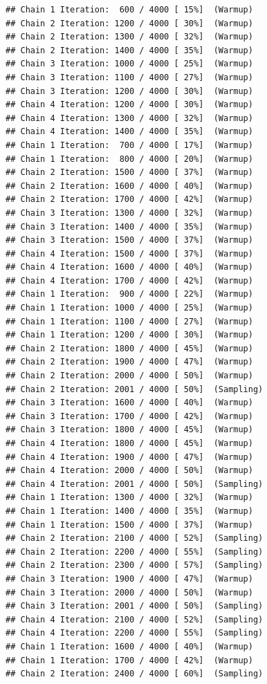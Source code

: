 \documentclass[
]{article}
\begin{document}
\begin{verbatim}
## Chain 1 Iteration:  600 / 4000 [ 15%]  (Warmup) 
## Chain 2 Iteration: 1200 / 4000 [ 30%]  (Warmup) 
## Chain 2 Iteration: 1300 / 4000 [ 32%]  (Warmup) 
## Chain 2 Iteration: 1400 / 4000 [ 35%]  (Warmup) 
## Chain 3 Iteration: 1000 / 4000 [ 25%]  (Warmup) 
## Chain 3 Iteration: 1100 / 4000 [ 27%]  (Warmup) 
## Chain 3 Iteration: 1200 / 4000 [ 30%]  (Warmup) 
## Chain 4 Iteration: 1200 / 4000 [ 30%]  (Warmup) 
## Chain 4 Iteration: 1300 / 4000 [ 32%]  (Warmup) 
## Chain 4 Iteration: 1400 / 4000 [ 35%]  (Warmup) 
## Chain 1 Iteration:  700 / 4000 [ 17%]  (Warmup) 
## Chain 1 Iteration:  800 / 4000 [ 20%]  (Warmup) 
## Chain 2 Iteration: 1500 / 4000 [ 37%]  (Warmup) 
## Chain 2 Iteration: 1600 / 4000 [ 40%]  (Warmup) 
## Chain 2 Iteration: 1700 / 4000 [ 42%]  (Warmup) 
## Chain 3 Iteration: 1300 / 4000 [ 32%]  (Warmup) 
## Chain 3 Iteration: 1400 / 4000 [ 35%]  (Warmup) 
## Chain 3 Iteration: 1500 / 4000 [ 37%]  (Warmup) 
## Chain 4 Iteration: 1500 / 4000 [ 37%]  (Warmup) 
## Chain 4 Iteration: 1600 / 4000 [ 40%]  (Warmup) 
## Chain 4 Iteration: 1700 / 4000 [ 42%]  (Warmup) 
## Chain 1 Iteration:  900 / 4000 [ 22%]  (Warmup) 
## Chain 1 Iteration: 1000 / 4000 [ 25%]  (Warmup) 
## Chain 1 Iteration: 1100 / 4000 [ 27%]  (Warmup) 
## Chain 1 Iteration: 1200 / 4000 [ 30%]  (Warmup) 
## Chain 2 Iteration: 1800 / 4000 [ 45%]  (Warmup) 
## Chain 2 Iteration: 1900 / 4000 [ 47%]  (Warmup) 
## Chain 2 Iteration: 2000 / 4000 [ 50%]  (Warmup) 
## Chain 2 Iteration: 2001 / 4000 [ 50%]  (Sampling) 
## Chain 3 Iteration: 1600 / 4000 [ 40%]  (Warmup) 
## Chain 3 Iteration: 1700 / 4000 [ 42%]  (Warmup) 
## Chain 3 Iteration: 1800 / 4000 [ 45%]  (Warmup) 
## Chain 4 Iteration: 1800 / 4000 [ 45%]  (Warmup) 
## Chain 4 Iteration: 1900 / 4000 [ 47%]  (Warmup) 
## Chain 4 Iteration: 2000 / 4000 [ 50%]  (Warmup) 
## Chain 4 Iteration: 2001 / 4000 [ 50%]  (Sampling) 
## Chain 1 Iteration: 1300 / 4000 [ 32%]  (Warmup) 
## Chain 1 Iteration: 1400 / 4000 [ 35%]  (Warmup) 
## Chain 1 Iteration: 1500 / 4000 [ 37%]  (Warmup) 
## Chain 2 Iteration: 2100 / 4000 [ 52%]  (Sampling) 
## Chain 2 Iteration: 2200 / 4000 [ 55%]  (Sampling) 
## Chain 2 Iteration: 2300 / 4000 [ 57%]  (Sampling) 
## Chain 3 Iteration: 1900 / 4000 [ 47%]  (Warmup) 
## Chain 3 Iteration: 2000 / 4000 [ 50%]  (Warmup) 
## Chain 3 Iteration: 2001 / 4000 [ 50%]  (Sampling) 
## Chain 4 Iteration: 2100 / 4000 [ 52%]  (Sampling) 
## Chain 4 Iteration: 2200 / 4000 [ 55%]  (Sampling) 
## Chain 1 Iteration: 1600 / 4000 [ 40%]  (Warmup) 
## Chain 1 Iteration: 1700 / 4000 [ 42%]  (Warmup) 
## Chain 2 Iteration: 2400 / 4000 [ 60%]  (Sampling) 

\end{verbatim}
\end{document}
